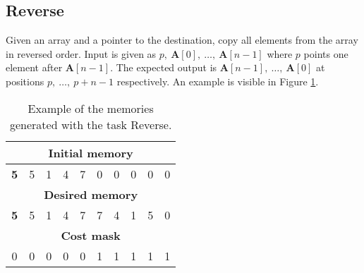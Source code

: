 \subsection{Reverse}
Given an array and a pointer to the destination, copy all elements from the array in reversed order. Input is given as $p,\ \textbf{A}[0],\ \dots,\ \textbf{A}[n-1]$ where $p$ points one element after $\textbf{A}[n-1]$. The expected output is $\textbf{A}[n-1],\ \dots,\ \textbf{A}[0]$ at positions $p,\ \dots,\ p+n-1$ respectively. An example is visible in Figure \ref{fig:reverse-example}.
\begin{table}[h!]
	\centering
	\begin{tabular}{|c|c|c|c|c|c|c|c|c|c|}
		\hline
		\multicolumn{10}{|c|}{\textbf{Initial memory}} \\ \hline
		\textbf{5} & 5 & 1 & 4 & 7 & 0 & 0 & 0 & 0 & 0 \\ \hline\hline\hline
		\multicolumn{10}{|c|}{\textbf{Desired memory}} \\ \hline
		\textbf{5} & 5 & 1 & 4 & 7 & 7 & 4 & 1 & 5 & 0 \\ \hline\hline\hline
		\multicolumn{10}{|c|}{\textbf{Cost mask}} \\ \hline
		0 & 0 & 0 & 0 & 0 & 1 & 1 & 1 & 1 & 1 \\ \hline
	\end{tabular}
	\caption{Example of the memories generated with the task Reverse.}
	\label{fig:reverse-example}
\end{table}
\FloatBarrier
